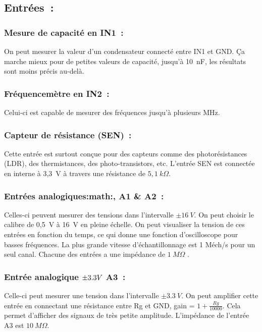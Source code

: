 \documentclass[a4paper,12pt,french]{sphinxmanual}
\begin{document}
\subsection{Entrées :}
\label{\detokenize{1.2:entrees}}

\subsubsection{Mesure de capacité en IN1 :}
\label{\detokenize{1.2:mesure-de-capacite-en-in1}}
On peut mesurer la valeur d’un condensateur connecté entre IN1 et
GND. Ça marche mieux pour de petites valeurs de capacité, jusqu’à
10 nF, les résultats sont moins précis au-delà.


\subsubsection{Fréquencemètre en IN2 :}
\label{\detokenize{1.2:frequencemetre-en-in2}}
Celui-ci est capable de mesurer des fréquences jusqu’à plusieurs MHz.


\subsubsection{Capteur de résistance (SEN) :}
\label{\detokenize{1.2:capteur-de-resistance-sen}}
Cette entrée est surtout conçue pour des capteurs comme des photorésistances
(LDR), des thermistances, des photo-transistors, etc. L’entrée SEN
est connectée en interne à 3,3 V à travers une résistance de \(5,1~k\Omega\).


\subsubsection{Entrées analogiques:math:, A1 \& A2 :}
\label{\detokenize{1.2:entrees-analogiques-math-pm16v-a1-a2}}
Celles-ci peuvent mesurer des tensions dans l’intervalle \(\pm16~V\).
On peut choisir le calibre de 0,5 V à 16 V en pleine échelle. On
peut visualiser la tension de ces entrées en fonction du temps, ce
qui donne une fonction d’oscilloscope pour basses fréquences. La plus
grande vitesse d’échantillonnage est 1 Méch/s pour un seul canal.
Chacune des entrées a une impédance de \(1~M\Omega\) .


\subsubsection{Entrée analogique \protect\(\pm3.3V\protect\) A3 :}
\label{\detokenize{1.2:entree-analogique-pm3-3v-a3}}
Celle-ci peut mesurer une tension dans l’intervalle \(\pm3.3~V\). On
peut amplifier cette entrée en connectant une résistance entre Rg
et GND, gain = \(1+\frac{Rg}{10000}\). Cela permet d’afficher des signaux
de très petite amplitude. L’impédance de l’entrée A3 est \(10~M\Omega\).
\end{document}
